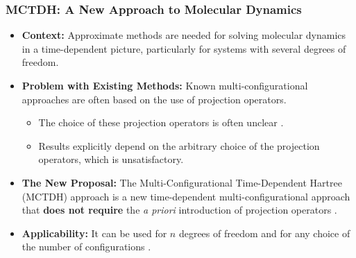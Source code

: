 \begin{frame}
    \frametitle{MCTDH: A New Approach to Molecular Dynamics}
    \begin{itemize}
        \item \textbf{Context:} Approximate methods are needed for solving molecular dynamics in a time-dependent picture, particularly for systems with several degrees of freedom.
        \item \textbf{Problem with Existing Methods:} Known multi-configurational approaches are often based on the use of projection operators.
        \begin{itemize}
            \item The choice of these projection operators is often unclear .
            \item Results explicitly depend on the arbitrary choice of the projection operators, which is unsatisfactory.
        \end{itemize}
        \item \textbf{The New Proposal:} The Multi-Configurational Time-Dependent Hartree (MCTDH) approach is a new time-dependent multi-configurational approach that \textbf{does not require} the \textit{a priori} introduction of projection operators .
        \item \textbf{Applicability:} It can be used for $n$ degrees of freedom and for any choice of the number of configurations .
    \end{itemize}
\end{frame}

